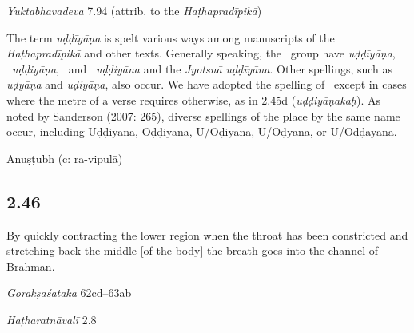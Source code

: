 \begin{ekdosis}
\begin{testimonia}[hp02_045]
\emph{Yuktabhavadeva} 7.94 (attrib. to the \emph{Haṭhapradīpikā})

\begin{versinnote}
\end{versinnote}
\end{testimonia}

\begin{philcomm}[hp02_045]
The term \emph{uḍḍīyāṇa} is spelt various ways among manuscripts of the \emph{Haṭhapradīpikā} and other texts. Generally speaking, the \textalpha\ group have \emph{uḍḍīyāṇa}, \textbeta\ \emph{uḍḍiyāṇa}, \textgamma\ and \textdelta\ \emph{uḍḍiyāna} and the \emph{Jyotsnā} \emph{uḍḍīyāna}. Other spellings, such as \emph{uḍyāṇa} and \emph{uḍiyāṇa}, also occur. We have adopted the spelling of \textalpha\ except in cases where the metre of a verse requires otherwise, as in 2.45d (\emph{uḍḍiyāṇakaḥ}). As noted by Sanderson (2007: 265), diverse spellings of the place by the same name occur, including Uḍḍiyāna, Oḍḍiyāna, U/Oḍiyāna, U/Oḍyāna, or U/Oḍḍayana. 
\end{philcomm}

\begin{metre}[hp02_045]
Anuṣṭubh (c: ra-vipulā)
\end{metre}

\subsection*{2.46}
\begin{translation}[hp02_046]
By quickly contracting the lower region when the throat has been constricted and stretching back the middle [of the body] the breath goes into the channel of Brahman.
\end{translation}

\begin{sources}[hp02_046]
\emph{Gorakṣaśataka} 62cd–63ab
\begin{versinnote}
\end{versinnote}
\end{sources}

\begin{testimonia}[hp02_046]
\emph{Haṭharatnāvalī} 2.8
\begin{versinnote}
\end{versinnote}


\end{testimonia}
\end{ekdosis}
